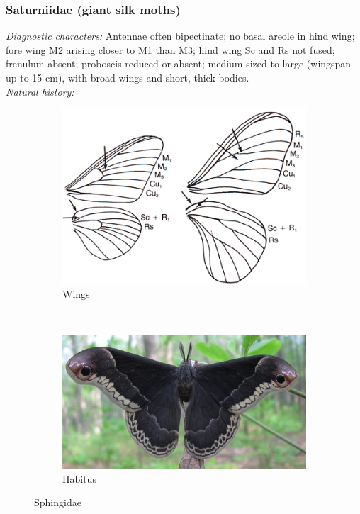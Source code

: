 \documentclass[letterpaper, 11pt]{article}
\begin{document}
\subsubsection{Saturniidae (giant silk moths)}
\noindent{}\textit{Diagnostic characters:} Antennae often bipectinate; no basal areole in hind wing; fore wing M2 arising closer to M1 than M3; hind wing Sc and Rs not fused; frenulum absent; proboscis reduced or absent; medium-sized to large (wingspan up to 15 cm), with broad wings and short, thick bodies.\\

\noindent{}\textit{Natural history:} 

\begin{figure}[ht!]
    \centering
    \begin{subfigure}[ht!]{0.4\textwidth}
        \includegraphics[width=\textwidth]{image18}
        \caption{Wings}
        \label{fig:saturniid1}
    \end{subfigure}
    ~ %
    \begin{subfigure}[ht!]{0.44\textwidth}
        \includegraphics[width=\textwidth]{image00}
        \caption{Habitus}
        \label{fig:saturniid2}
    \end{subfigure}
    \caption{Sphingidae}\label{fig:saturniids}
\end{figure}
\end{document}

